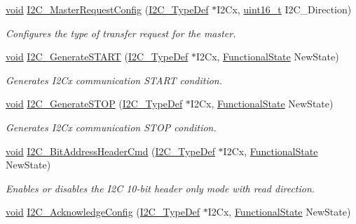 \begin{DoxyCompactItemize}
\hyperlink{group___n_a_m_e_ga18028b8badbf1ea7e704ccac3c488e82}{void} \hyperlink{group___i2_c___group2_ga96cd7cbef89fc5b0016eaf0b1251f85f}{I2\-C\-\_\-\-Master\-Request\-Config} (\hyperlink{struct_i2_c___type_def}{I2\-C\-\_\-\-Type\-Def} $\ast$I2\-Cx, \hyperlink{stdint_8h_a273cf69d639a59973b6019625df33e30}{uint16\-\_\-t} I2\-C\-\_\-\-Direction)
\begin{DoxyCompactList}\small\item\em Configures the type of transfer request for the master. \end{DoxyCompactList}\item 
\hyperlink{group___n_a_m_e_ga18028b8badbf1ea7e704ccac3c488e82}{void} \hyperlink{group___i2_c___group2_ga36c522b471588be9779c878222ccb20f}{I2\-C\-\_\-\-Generate\-S\-T\-A\-R\-T} (\hyperlink{struct_i2_c___type_def}{I2\-C\-\_\-\-Type\-Def} $\ast$I2\-Cx, \hyperlink{group___exported__types_gac9a7e9a35d2513ec15c3b537aaa4fba1}{Functional\-State} New\-State)
\begin{DoxyCompactList}\small\item\em Generates I2\-Cx communication S\-T\-A\-R\-T condition. \end{DoxyCompactList}\item 
\hyperlink{group___n_a_m_e_ga18028b8badbf1ea7e704ccac3c488e82}{void} \hyperlink{group___i2_c___group2_ga5c92cb573ca0ae58cc465e5400246561}{I2\-C\-\_\-\-Generate\-S\-T\-O\-P} (\hyperlink{struct_i2_c___type_def}{I2\-C\-\_\-\-Type\-Def} $\ast$I2\-Cx, \hyperlink{group___exported__types_gac9a7e9a35d2513ec15c3b537aaa4fba1}{Functional\-State} New\-State)
\begin{DoxyCompactList}\small\item\em Generates I2\-Cx communication S\-T\-O\-P condition. \end{DoxyCompactList}\item 
\hyperlink{group___n_a_m_e_ga18028b8badbf1ea7e704ccac3c488e82}{void} \hyperlink{group___i2_c___group2_gaa669b6beadf9b0e043155f353d77d659}{I2\-C\-\_\-Bit\-Address\-Header\-Cmd} (\hyperlink{struct_i2_c___type_def}{I2\-C\-\_\-\-Type\-Def} $\ast$I2\-Cx, \hyperlink{group___exported__types_gac9a7e9a35d2513ec15c3b537aaa4fba1}{Functional\-State} New\-State)
\begin{DoxyCompactList}\small\item\em Enables or disables the I2\-C 10-\/bit header only mode with read direction. \end{DoxyCompactList}\item 
\hyperlink{group___n_a_m_e_ga18028b8badbf1ea7e704ccac3c488e82}{void} \hyperlink{group___i2_c___group2_ga7bb44e894d68a7991f564c43fb187486}{I2\-C\-\_\-\-Acknowledge\-Config} (\hyperlink{struct_i2_c___type_def}{I2\-C\-\_\-\-Type\-Def} $\ast$I2\-Cx, \hyperlink{group___exported__types_gac9a7e9a35d2513ec15c3b537aaa4fba1}{Functional\-State} New\-State)

\end{DoxyCompactItemize}

